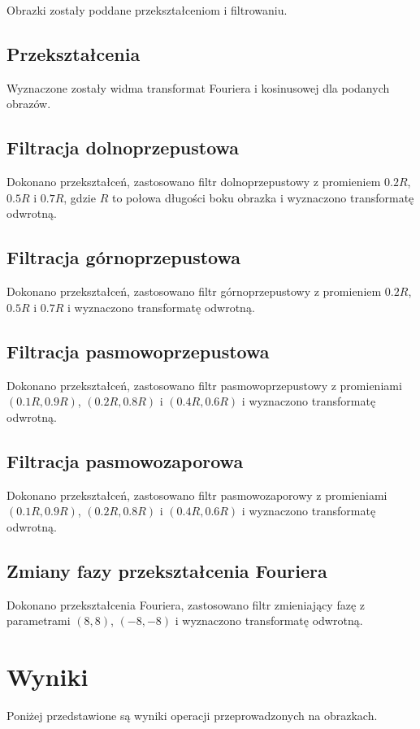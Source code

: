 \documentclass{classrep}
\begin{document}
Obrazki zostały poddane przekształceniom i filtrowaniu.

\subsection{Przekształcenia}
\label{sec.tests.transforms}
Wyznaczone zostały widma transformat Fouriera i kosinusowej dla podanych obrazów.

\subsection{Filtracja dolnoprzepustowa}
\label{sec.tests.lowpass}
Dokonano przekształceń, zastosowano filtr dolnoprzepustowy z promieniem $0.2R$, $0.5R$ i $0.7R$, gdzie $R$ to połowa długości boku obrazka i wyznaczono transformatę odwrotną.

\subsection{Filtracja górnoprzepustowa}
\label{sec.tests.highpass}
Dokonano przekształceń, zastosowano filtr górnoprzepustowy z promieniem $0.2R$, $0.5R$ i $0.7R$ i wyznaczono transformatę odwrotną.

\subsection{Filtracja pasmowoprzepustowa}
\label{sec.tests.bandpass}
Dokonano przekształceń, zastosowano filtr pasmowoprzepustowy z promieniami $(0.1R, 0.9R)$, $(0.2R, 0.8R)$ i $(0.4R, 0.6R)$ i wyznaczono transformatę odwrotną.

\subsection{Filtracja pasmowozaporowa}
\label{sec.tests.bandstop}
Dokonano przekształceń, zastosowano filtr pasmowozaporowy z promieniami $(0.1R, 0.9R)$, $(0.2R, 0.8R)$ i $(0.4R, 0.6R)$ i wyznaczono transformatę odwrotną.

\subsection{Zmiany fazy przekształcenia Fouriera}
\label{sec.tests.phaseshift}
Dokonano przekształcenia Fouriera, zastosowano filtr zmieniający fazę z parametrami $(8, 8)$, $(-8, -8)$ i wyznaczono transformatę odwrotną.
\clearpage

\section{Wyniki}
Poniżej przedstawione są wyniki operacji przeprowadzonych na obrazkach.
\end{document}
